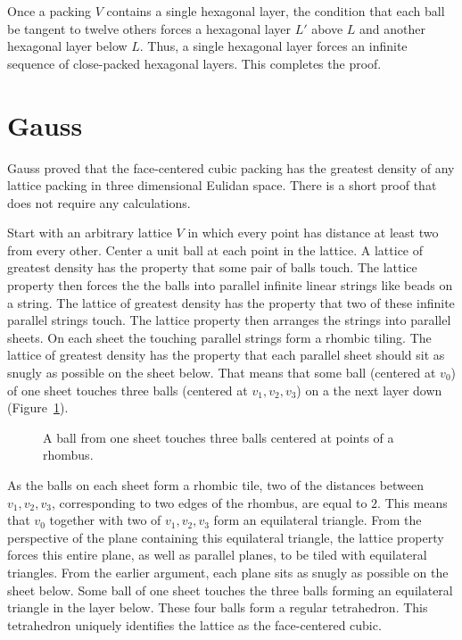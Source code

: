 Once a packing $V$ contains a single hexagonal layer, the condition
that each ball be tangent to twelve others forces a hexagonal layer
$L'$ above $L$ and another hexagonal layer below $L$.  Thus, a single
hexagonal layer forces an infinite sequence of close-packed hexagonal
layers.  This completes the proof.



\section{Gauss}

Gauss proved that the face-centered cubic packing has the greatest density
of any lattice packing in three dimensional Eulidan space.  There is a
short proof that does not require any calculations.

Start with an arbitrary lattice $V$ in which every point has distance
at least two from every other.  Center a unit ball at each point in
the lattice.  A lattice of greatest density has the property that some
pair of balls touch.  The lattice property then forces the the balls
into parallel infinite linear strings like beads on a string.  The
lattice of greatest density has the property that two of these
infinite parallel strings touch.  The lattice property then arranges
the strings into parallel sheets.  On each sheet the touching parallel
strings form a rhombic tiling.  The lattice of greatest density has
the property that each parallel sheet should sit as snugly as possible
on the sheet below.  That means that some ball (centered at $v_0$) of
one sheet touches three balls (centered at $v_1,v_2,v_3$) on a the
next layer down (Figure~\ref{fig:rhombus}).

\begin{figure}[htb]
  \centering
  \caption{A ball from one sheet touches three balls centered at points of a rhombus.}
  \label{fig:rhombus}
\end{figure}

As the balls on each sheet form a rhombic tile, two of the distances
between $v_1,v_2,v_3$, corresponding to two edges of the rhombus, are
equal to $2$.  This means that $v_0$ together with two of
$v_1,v_2,v_3$ form an equilateral triangle.  From the perspective of
the plane containing this equilateral triangle, the lattice property
forces this entire plane, as well as parallel planes, to be tiled with
equilateral triangles.  From the earlier argument, each plane sits as
snugly as possible on the sheet below.  Some ball of one sheet touches
the three balls forming an equilateral triangle in the layer below.
These four balls form a regular tetrahedron.  This tetrahedron
uniquely identifies the lattice as the face-centered cubic.







